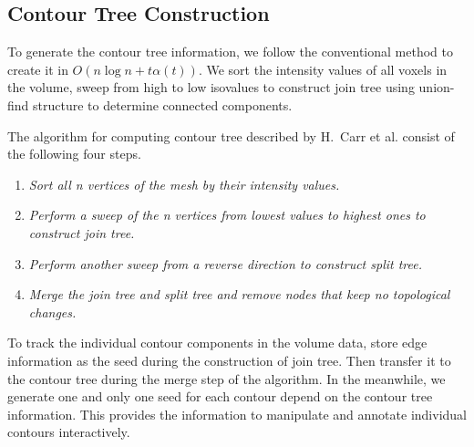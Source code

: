 \documentclass[11pt, b5paper]{report}
\newcommand{\enumeratefix}[1][
\setlength{\parskip}{0pt}
\setlength{\parsep}{0pt}
\setlength{\topsep}{0pt}
\setlength{\itemsep}{0pt}
]{#1}
\begin{document}
\subsection{Contour Tree Construction}

To generate the contour tree information, we follow the conventional 
method to create it in $O(n \log n + t\alpha(t))$. We sort the intensity 
values of all voxels in the volume, sweep from high to low isovalues to 
construct join tree using union-find structure\cite{tarjan1975efficiency} 
to determine connected components.



The algorithm for computing contour tree described by 
H.~Carr et al.\cite{carr2000computing} consist of the following four steps.
\begin{enumerate}
\enumeratefix{}
\item \textsl{Sort all \emph{n} vertices of the mesh by their intensity values.}
\item \textsl{Perform a sweep of the \emph{n} vertices from lowest values to 
  highest ones to construct \emph{join tree}.}
\item \textsl{Perform another sweep from a reverse direction to construct 
  \emph{split tree}.}
\item \textsl{Merge the join tree and split tree and remove nodes %
  that keep no topological changes.}
\end{enumerate}

To track the individual contour components in the volume data, store edge
information as the seed during the construction of join tree. Then transfer
it to the contour tree during the merge step of the algorithm. 
In the meanwhile, we generate one and only one seed for each contour depend 
on the contour tree information. This provides the information to 
manipulate and annotate individual contours interactively.
\end{document}
